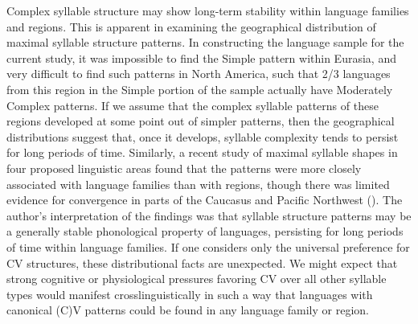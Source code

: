   Complex syllable structure may show long-term stability within language families and regions. This is apparent in examining the geographical distribution of maximal syllable structure patterns. In constructing the language sample for the current study, it was impossible to find the Simple pattern within Eurasia, and very difficult to find such patterns in North America, such that 2/3 languages from this region in the Simple portion of the sample actually have Moderately Complex patterns. If we assume that the complex syllable patterns of these regions developed at some point out of simpler patterns, then the geographical distributions suggest that, once it develops, syllable complexity tends to persist for long periods of time. Similarly, a recent study of maximal syllable shapes in four proposed linguistic areas found that the patterns were more closely associated with language families than with regions, though there was limited evidence for convergence in parts of the Caucasus and Pacific Northwest (\citealt{NapoleãodeSouza2017}). The author’s interpretation of the findings was that syllable structure patterns may be a generally stable phonological property of languages, persisting for long periods of time within language families. If one considers only the universal preference for CV structures, these distributional facts are unexpected. We might expect that strong cognitive or physiological pressures favoring CV over all other syllable types would manifest crosslinguistically in such a way that languages with canonical (C)V patterns could be found in any language family or region.

